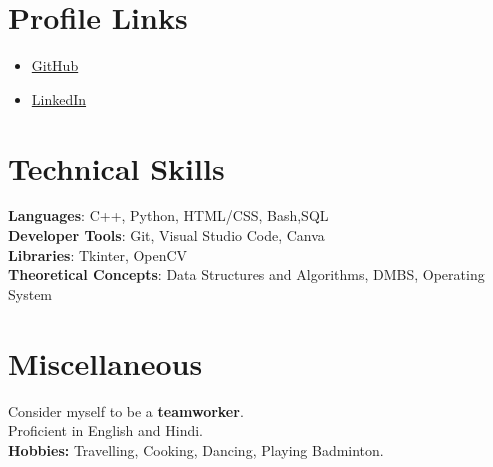 \documentclass[a4paper,20pt]{article}
\newcommand{\resumeItem}[1]{
  \item\small{
    {#1 \vspace{-2pt}}
  }
}
\newcommand{\resumeItemListStart}{\begin{itemize}}
\newcommand{\resumeItemListEnd}{\end{itemize}\vspace{-5pt}}
\begin{document}
\section{Profile Links}
 \begin{itemize}[leftmargin=0.15in, label={}]
    \resumeItemListStart
        \resumeItem {\href{https://github.com/anushraya}{GitHub}}
        
        \resumeItem {\href{https://www.linkedin.com/in/anushraya-sharma-9a967a204}{LinkedIn}}
      \resumeItemListEnd
 \end{itemize}
 \vspace{-16pt}

%
\section{Technical Skills}
 \begin{itemize}[leftmargin=0.15in, label={}]
    \small{\item{
     \textbf{Languages}{: C++, Python, HTML/CSS, Bash,SQL} \\
     \textbf{Developer Tools}{: Git, Visual Studio Code, Canva} \\
     \textbf{Libraries}{: Tkinter, OpenCV} \\
     \textbf{Theoretical Concepts}{: Data Structures and Algorithms, DMBS, Operating System} \\
    }}
 \end{itemize}
 \vspace{-16pt}

%
\section{Miscellaneous}
 \begin{itemize}[leftmargin=0.15in, label={}]
    \small{\item{
     {Consider myself to be a \textbf{teamworker}.} \\
     {Proficient in English and Hindi.} \\
     {\textbf{Hobbies:}  Travelling, Cooking, Dancing, Playing Badminton.} \\
    }}
 \end{itemize}
 \vspace{-16pt}
\end{document}
